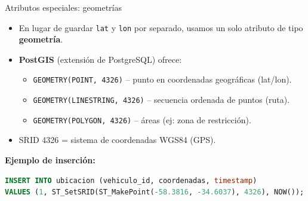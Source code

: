 \documentclass[10pt, aspectratio=169]{beamer}
\begin{document}
\begin{frame}[fragile]{Atributos especiales: geometrías}
    \begin{itemize}
        \item En lugar de guardar \texttt{lat} y \texttt{lon} por separado, usamos un solo atributo de tipo \textbf{geometría}.
        \item \textbf{PostGIS} (extensión de PostgreSQL) ofrece:
            \begin{itemize}
                \item \texttt{GEOMETRY(POINT, 4326)} – punto en coordenadas geográficas (lat/lon).
                \item \texttt{GEOMETRY(LINESTRING, 4326)} – secuencia ordenada de puntos (ruta).
                \item \texttt{GEOMETRY(POLYGON, 4326)} – áreas (ej: zona de restricción).
            \end{itemize}
        \item SRID 4326 = sistema de coordenadas WGS84 (GPS).
    \end{itemize}
    \vspace{0.3cm}

    \textbf{Ejemplo de inserción:}

    \begin{lstlisting}[language=SQL]
INSERT INTO ubicacion (vehiculo_id, coordenadas, timestamp)
VALUES (1, ST_SetSRID(ST_MakePoint(-58.3816, -34.6037), 4326), NOW());
    \end{lstlisting}
\end{frame}
\end{document}
